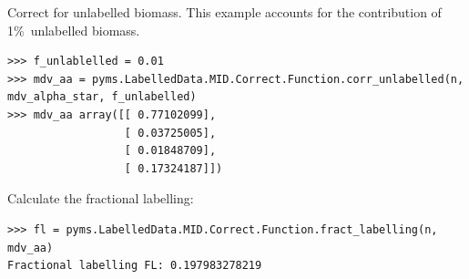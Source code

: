 Correct for unlabelled biomass. This example accounts for the contribution
of 1\%\ unlabelled biomass.

\begin{verbatim}
>>> f_unlablelled = 0.01 
>>> mdv_aa = pyms.LabelledData.MID.Correct.Function.corr_unlabelled(n, mdv_alpha_star, f_unlabelled)
>>> mdv_aa array([[ 0.77102099],
                  [ 0.03725005],
                  [ 0.01848709],
                  [ 0.17324187]])
\end{verbatim}

Calculate the fractional labelling:

\begin{verbatim}
>>> fl = pyms.LabelledData.MID.Correct.Function.fract_labelling(n, mdv_aa)
Fractional labelling FL: 0.197983278219
\end{verbatim}
